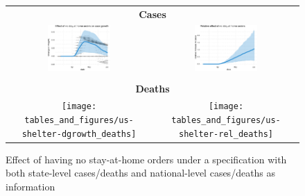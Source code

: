 \documentclass[11pt,reqno,letter]{amsart}
\theoremstyle{definition}
\begin{document}
\begin{figure}[ht]
  \caption{Effect of having no stay-at-home orders     under a specification with both
  state-level cases/deaths and national-level cases/deaths as information \label{fig:US-shelter-SI}}
  \begin{minipage}{\linewidth}
    \centering
    \begin{tabular}{cc}
      \multicolumn{2}{c}{\textbf{Cases}} \\
      \includegraphics[width=0.45\textwidth]{tables_and_figures/us-shelter-dgrowth}
      &
        \includegraphics[width=0.45\textwidth]{tables_and_figures/us-shelter-rel}
      \\
      \\
      \multicolumn{2}{c}{\textbf{Deaths}} \\
      \texttt{[image: tables\_and\_figures/us-shelter-dgrowth\_deaths]}
      &
        \texttt{[image: tables\_and\_figures/us-shelter-rel\_deaths]}
    \end{tabular}
  \end{minipage}
\end{figure}

\FloatBarrier

$\;$
\end{document}
